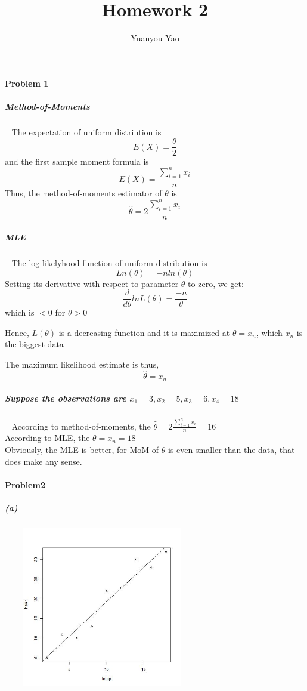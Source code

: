 \documentclass{article}
\title{Homework 2}
\author{Yuanyou Yao}
\begin{document}
\maketitle{}
\paragraph{Problem 1}
\subparagraph{Method-of-Moments}~{}
\newline
The expectation of uniform distriution is\[E(X)=\frac{\theta}{2}\]
and the first sample moment formula is\[E(X)=\frac{\sum^n_{i=1}x_i}{n}\]
Thus, the method-of-moments estimator of $\theta$ is\[\hat{\theta}=2\frac{\sum^n_{i=1}x_i}{n}\]
\subparagraph{MLE}~{}
\newline
The log-likelyhood function of uniform distribution is\[Ln(\theta)=-nln(\theta)\]
Setting its derivative with respect to parameter $\theta$ to zero, we get:\[\frac{d}{d\theta}lnL(\theta)=\frac{-n}{\theta}\]
which is $< 0$ for $\theta > 0$

Hence, $L(\theta)$ is a decreasing function and it is maximized at $\theta = x_n$, which $x_n$ is the biggest data

The maximum likelihood estimate is thus,\[\hat{\theta}=x_n\]
\subparagraph{Suppose the observations are $x_1=3, x_2=5, x_3=6, x_4=18$}~{}
\newline
According to method-of-moments, the $\hat{\theta}=2\frac{\sum^n_{i=1}x_i}{n}=16$\\
According to MLE, the  $\theta = x_n=18$\\
Obviously, the MLE is better, for MoM of $\theta$ is even smaller than the data, that does make any sense.
\paragraph{Problem2}
\subparagraph{(a)}~{}
\newline
\includegraphics[height=7cm,width=8cm]{2.jpg}
\end{document}
